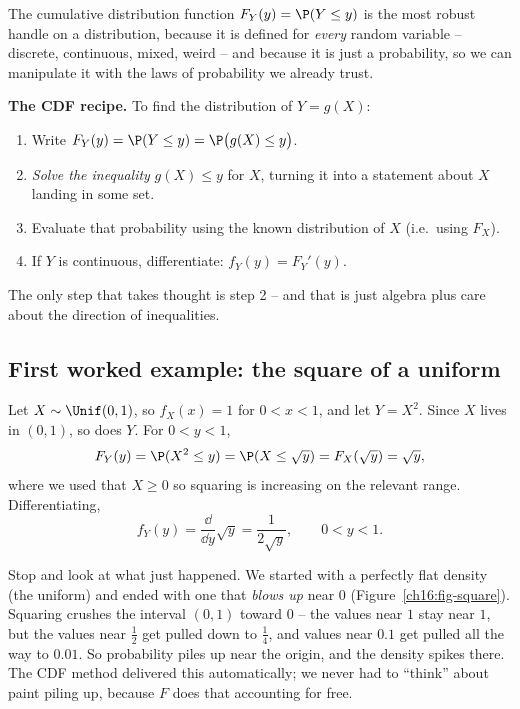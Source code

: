 The cumulative distribution function $F_Y(y) = \P(Y \le y)$ is the most robust handle on a
distribution, because it is defined for \emph{every} random variable -- discrete,
continuous, mixed, weird -- and because it is just a probability, so we can manipulate it
with the laws of probability we already trust.

\begin{focusbox}
\textbf{The CDF recipe.} To find the distribution of $Y = g(X)$:
\begin{enumerate}
  \item Write $F_Y(y) = \P(Y \le y) = \P\big(g(X) \le y\big)$.
  \item \emph{Solve the inequality} $g(X) \le y$ for $X$, turning it into a statement
        about $X$ landing in some set.
  \item Evaluate that probability using the known distribution of $X$ (i.e.\ using
        $F_X$).
  \item If $Y$ is continuous, differentiate: $f_Y(y) = F_Y'(y)$.
\end{enumerate}
The only step that takes thought is step 2 -- and that is just algebra plus care about the
direction of inequalities.
\end{focusbox}

\subsection{First worked example: the square of a uniform}

\begin{example}[$Y=X^2$ for a uniform]
\label{ch16:unif-square}
Let $X \sim \Unif(0,1)$, so $f_X(x) = 1$ for $0 < x < 1$, and let $Y = X^2$. Since $X$
lives in $(0,1)$, so does $Y$. For $0 < y < 1$,
\[
  F_Y(y) = \P(X^2 \le y) = \P(X \le \sqrt{y}) = F_X(\sqrt{y}) = \sqrt{y},
\]
where we used that $X \ge 0$ so squaring is increasing on the relevant range.
Differentiating,
\[
  f_Y(y) = \frac{\dd}{\dd y}\sqrt{y} = \frac{1}{2\sqrt{y}}, \qquad 0 < y < 1.
\]
\end{example}

Stop and look at what just happened. We started with a perfectly flat density (the
uniform) and ended with one that \emph{blows up} near $0$ (Figure~\ref{ch16:fig-square}).
Squaring crushes the interval $(0,1)$ toward $0$ -- the values near $1$ stay near $1$, but
the values near $\tfrac12$ get pulled down to $\tfrac14$, and values near $0.1$ get pulled
all the way to $0.01$. So probability piles up near the origin, and the density spikes
there. The CDF method delivered this automatically; we never had to ``think'' about
paint piling up, because $F$ does that accounting for free.

